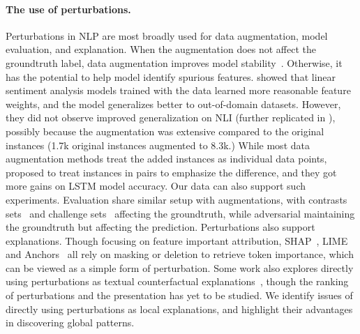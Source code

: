 \paragraph{The use of perturbations.}
Perturbations in NLP are most broadly used for data augmentation, model evaluation, and explanation.
When the augmentation does not affect the groundtruth label, data augmentation improves model stability~\cite{Wu2019ConditionalBC, Wei2019EDAED, Kumar2020DataAU}.
Otherwise, it has the potential to help model identify spurious features.
\citet{kaushik2019learning} showed that linear sentiment analysis models trained with the data learned more reasonable feature weights, and the model generalizes better to out-of-domain datasets.
However, they did not observe improved generalization on NLI (further replicated in \citet{huang2020counterfactually}), possibly because the augmentation was extensive compared to the original instances (1.7k original instances augmented to 8.3k.)
While most data augmentation methods treat the added instances as individual data points, \citet{teney2020learning} proposed to treat instances in pairs to emphasize the difference, and they got more gains on LSTM model accuracy. 
Our data can also support such experiments.
Evaluation share similar setup with augmentations, with contrasts sets~\cite{kaushik2019learning} and challenge sets~\cite{Geiger2019PosingFG, kaushik2019learning, nie2019analyzing} affecting the groundtruth, while adversarial maintaining the groundtruth but affecting the prediction.
Perturbations also support explanations. 
Though focusing on feature important attribution, SHAP~\cite{NIPS2017_7062}, LIME~\cite{Ribeiro2016WhySI} and Anchors~\cite{ribeiro2018anchors} all rely on masking or deletion to retrieve token importance, which can be viewed as a simple form of perturbation.
Some work also explores directly using perturbations as textual counterfactual explanations~\cite{hase2020evaluating, vig2020causal, kang2020counterfactual}, though the ranking of perturbations and the presentation has yet to be studied.
We identify issues of directly using perturbations as local explanations, and highlight their advantages in discovering global patterns.

